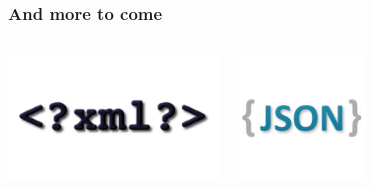 \documentclass{beamer}
\begin{document}
\begin{frame}
  \frametitle{And more to come}

  
  \begin{columns}[c]
    \begin{center}
      \includegraphics[height=9em]{xml.png}
    \end{center}
    \begin{center}
      \includegraphics[height=9em]{logo-json.png}
    \end{center}
  \end{columns}
\end{frame}
\end{document}
